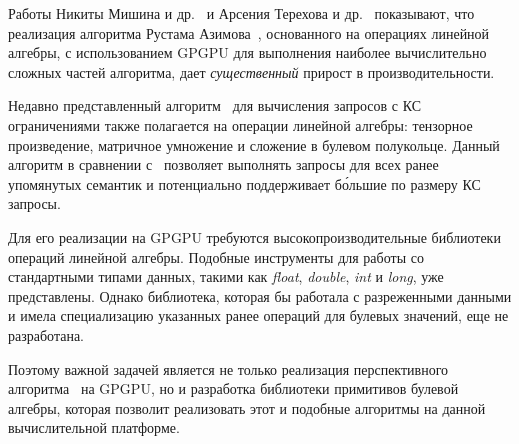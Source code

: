 Работы Никиты Мишина и др.~\cite{inproceedings:cfpq_matrix_evaluation} и Арсения Терехова и др.~\cite{inproceedings:cfqp_matrix_with_single_source} показывают, что реализация алгоритма Рустама Азимова~\cite{inproceedings:matrix_cfpq}, основанного на операциях линейной алгебры, с использованием GPGPU для выполнения наиболее вычислительно сложных частей алгоритма, дает \textit{существенный} прирост в производительности.

Недавно представленный алгоритм~\cite{inbook:kronecker_cfpq_adbis} для вычисления запросов с КС ограничениями также полагается на операции линейной алгебры: тензорное произведение, матричное умножение и сложение в булевом полукольце. Данный алгоритм в сравнении с~\cite{inproceedings:cfqp_matrix_with_single_source} позволяет выполнять запросы для всех ранее упомянутых семантик и потенциально поддерживает б\'ольшие по размеру КС запросы.

Для его реализации на GPGPU требуются высокопроизводительные библиотеки операций линейной алгебры. Подобные инструменты для работы со стандартными типами данных, такими как \textit{float}, \textit{double}, \textit{int} и \textit{long}, уже представлены. Однако библиотека, которая бы работала с разреженными данными и имела специализацию указанных ранее операций для булевых значений, еще не разработана. 

Поэтому важной задачей является не только реализация перспективного алгоритма~\cite{inbook:kronecker_cfpq_adbis} на GPGPU, но и разработка библиотеки примитивов булевой алгебры, которая позволит реализовать этот и подобные алгоритмы на данной вычислительной платформе.
